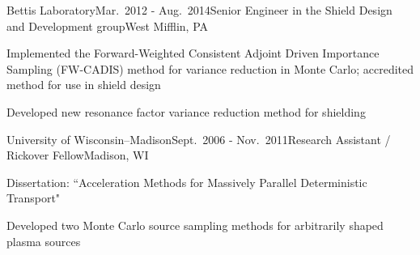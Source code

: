 
\begin{rSubsection}{Bettis Laboratory}{Mar.\ 2012 - Aug.\ 2014}{Senior Engineer in the Shield Design and Development group}{West Mifflin, PA}
\item Implemented the Forward-Weighted Consistent Adjoint Driven Importance Sampling (FW-CADIS) method for variance reduction in Monte Carlo; accredited method for use in shield design
\item Developed new resonance factor variance reduction method for shielding%
\end{rSubsection}


\begin{rSubsection}{University of Wisconsin--Madison}{Sept.\ 2006 - Nov.\ 2011}{Research Assistant / Rickover Fellow}{Madison, WI}
\item Dissertation: ``Acceleration Methods for Massively Parallel Deterministic Transport"%
\item Developed two Monte Carlo source sampling methods for arbitrarily shaped plasma sources%
\end{rSubsection}



